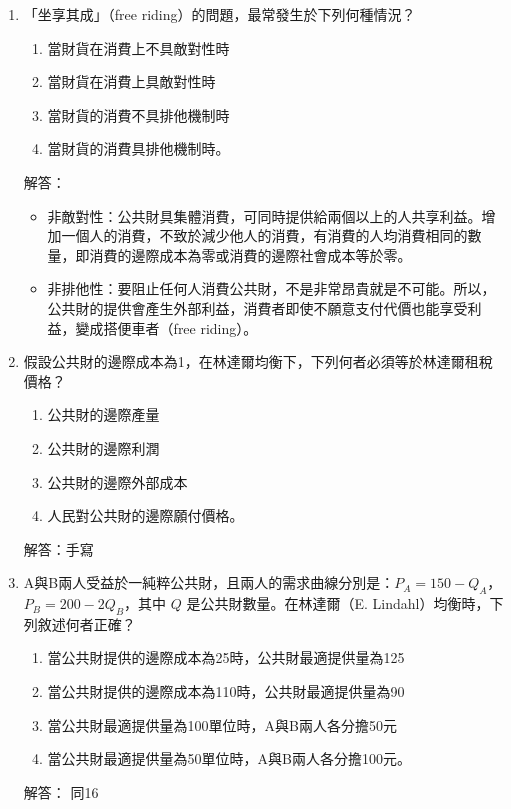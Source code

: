 \documentclass[12pt, a4paper]{article}
\begin{document}
\begin{enumerate}
    \item 「坐享其成」（free riding）的問題，最常發生於下列何種情況？
    \begin{enumerate}[label=\Alph*.]
        \item 當財貨在消費上不具敵對性時
        \item 當財貨在消費上具敵對性時
        \item 當財貨的消費不具排他機制時
        \item 當財貨的消費具排他機制時。
    \end{enumerate}
    解答：
    \begin{itemize}
        \item 非敵對性：公共財具集體消費，可同時提供給兩個以上的人共享利益。增加一個人的消費，不致於減少他人的消費，有消費的人均消費相同的數量，即消費的邊際成本為零或消費的邊際社會成本等於零。
        \item 非排他性：要阻止任何人消費公共財，不是非常昂貴就是不可能。所以，公共財的提供會產生外部利益，消費者即使不願意支付代價也能享受利益，變成搭便車者（free riding）。
    \end{itemize}

    \item 假設公共財的邊際成本為1，在林達爾均衡下，下列何者必須等於林達爾租稅價格？
    \begin{enumerate}[label=\Alph*.]
        \item 公共財的邊際產量
        \item 公共財的邊際利潤
        \item 公共財的邊際外部成本
        \item 人民對公共財的邊際願付價格。
    \end{enumerate}
    解答：手寫

    \item A與B兩人受益於一純粹公共財，且兩人的需求曲線分別是：\(P_A=150-Q_A\)，\(P_B=200-2Q_B\)，其中 \(Q\) 是公共財數量。在林達爾（E. Lindahl）均衡時，下列敘述何者正確？
    \begin{enumerate}[label=\Alph*.]
        \item 當公共財提供的邊際成本為25時，公共財最適提供量為125
        \item 當公共財提供的邊際成本為110時，公共財最適提供量為90
        \item 當公共財最適提供量為100單位時，A與B兩人各分擔50元
        \item 當公共財最適提供量為50單位時，A與B兩人各分擔100元。
    \end{enumerate}
    解答：
    同16


\end{enumerate}
\end{document}
